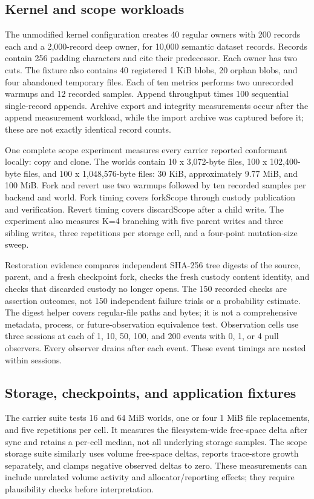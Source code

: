 \documentclass[11pt,a4paper]{article}
\begin{document}
\subsection{Kernel and scope workloads}

The unmodified kernel configuration creates 40 regular owners with 200 records each and a 2,000-record deep owner, for 10,000 semantic dataset records. Records contain 256 padding characters and cite their predecessor. Each owner has two cuts. The fixture also contains 40 registered 1 KiB blobs, 20 orphan blobs, and four abandoned temporary files. Each of ten metrics performs two unrecorded warmups and 12 recorded samples. Append throughput times 100 sequential single-record appends. Archive export and integrity measurements occur after the append measurement workload, while the import archive was captured before it; these are not exactly identical record counts.


One complete scope experiment measures every carrier reported conformant locally: copy and clone. The worlds contain 10 x 3,072-byte files, 100 x 102,400-byte files, and 100 x 1,048,576-byte files: 30 KiB, approximately 9.77 MiB, and 100 MiB. Fork and revert use two warmups followed by ten recorded samples per backend and world. Fork timing covers forkScope through custody publication and verification. Revert timing covers discardScope after a child write. The experiment also measures K=4 branching with five parent writes and three sibling writes, three repetitions per storage cell, and a four-point mutation-size sweep.


Restoration evidence compares independent SHA-256 tree digests of the source, parent, and a fresh checkpoint fork, checks the fresh custody content identity, and checks that discarded custody no longer opens. The 150 recorded checks are assertion outcomes, not 150 independent failure trials or a probability estimate. The digest helper covers regular-file paths and bytes; it is not a comprehensive metadata, process, or future-observation equivalence test. Observation cells use three sessions at each of 1, 10, 50, 100, and 200 events with 0, 1, or 4 pull observers. Every observer drains after each event. These event timings are nested within sessions.


\subsection{Storage, checkpoints, and application fixtures}

The carrier suite tests 16 and 64 MiB worlds, one or four 1 MiB file replacements, and five repetitions per cell. It measures the filesystem-wide free-space delta after sync and retains a per-cell median, not all underlying storage samples. The scope storage suite similarly uses volume free-space deltas, reports trace-store growth separately, and clamps negative observed deltas to zero. These measurements can include unrelated volume activity and allocator/reporting effects; they require plausibility checks before interpretation.
\end{document}
